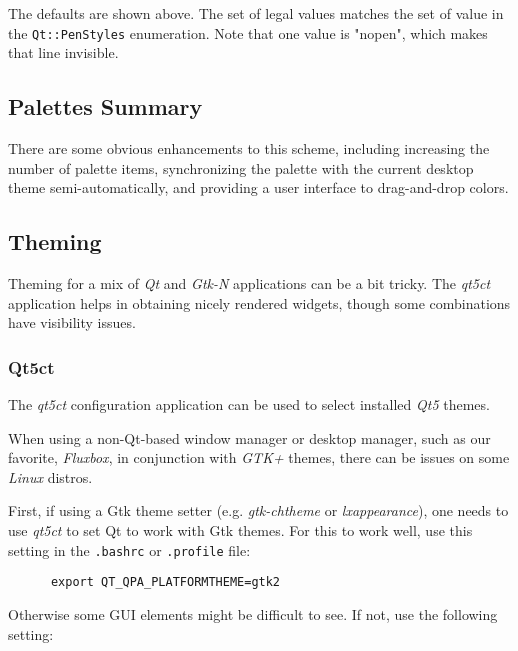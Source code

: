    The defaults are shown above.
   The set of legal values matches the set
   of value in the \texttt{Qt::PenStyles} enumeration.
   Note that one value is "nopen", which makes that line invisible.

\subsection{Palettes Summary}
\label{subsec:palettes_summary}

   There are some obvious enhancements to this scheme, including increasing the
   number of palette items, synchronizing the palette with the current desktop
   theme semi-automatically, and providing a user interface to drag-and-drop
   colors.

\subsection{Theming}
\label{subsec:palettes_theming}

   Theming for a mix of \textsl{Qt} and \textsl{Gtk-N} applications can be a
   bit tricky.
   The \textsl{qt5ct} application helps in obtaining nicely rendered
   widgets, though some combinations have visibility issues.

\subsubsection{Qt5ct}
\label{subsubsec:palettes_theming_qt5ct}

   The \textsl{qt5ct} configuration application can be used to select installed
   \textsl{Qt5} themes.

   When using a non-Qt-based window manager or desktop manager, such as our
   favorite, \textsl{Fluxbox}, in conjunction with \textsl{GTK+} themes,
   there can be issues on some \textsl{Linux} distros.

   First, if using a Gtk theme setter (e.g. \textsl{gtk-chtheme}
   or \textsl{lxappearance}),
   one needs to
   use \textsl{qt5ct} to set Qt to work with Gtk themes.
   For this to work well, use this setting in the \texttt{.bashrc} or
   \texttt{.profile} file:

   \begin{verbatim}
      export QT_QPA_PLATFORMTHEME=gtk2
   \end{verbatim}

   Otherwise some GUI elements might be difficult to see.
   If not, use the following setting:

